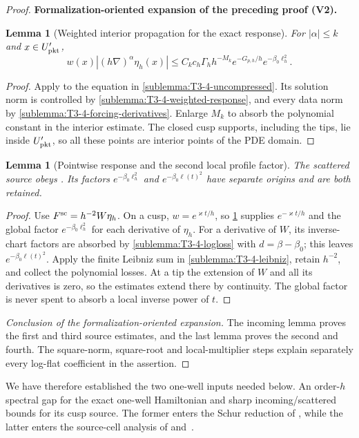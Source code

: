 \documentclass[11pt]{article}
\newtheorem{lemma}[theorem]{Lemma}
\newcommand{\formalisationparentid}{X}
\newenvironment{formalisationaddition}[1]{\par\medskip\begingroup\color{blue}\def\formalisationparentid{#1}\setcounter{formalizationsublemma}{0}\let\lemma\formalizationsublemma\let\endlemma\endformalizationsublemma
  \def\Eo{\mathcal E_h^\circ}\def\EE{\mathcal E_h}\def\phio{\phi_h^\circ}\def\phih{\phi_h}\def\Ho{H_h^{\rm atom}(v^\circ)}\def\Ha{H_h^{\rm atom}}\def\HL{H_h^{L}}\def\Dh{D_h}\def\Log{\operatorname{Log}}\def\ellh{\ell_h}\def\Gp{G_{p,h}}\def\Ast{A_{*,h}}\def\ahat{\widehat{\mathfrak a}_h}\def\ah{\mathfrak a_h}\def\rh{\widehat\rho_h}\def\deltah{\widehat\delta_h}\def\oldref##1{\textup{(##1)}}\def\interface##1{\par\noindent\textit{Analytical interface used here.} ##1\par}\def\finish{\par\noindent\textit{Conclusion of the formalization-oriented expansion.} }\par\noindent\textbf{Formalization-oriented expansion of the preceding proof (V2).}\par\smallskip
}{\par\endgroup\medskip
}
\begin{document}
\begin{proof}
\begin{formalisationaddition}{T3.4}
\begin{lemma}[Weighted interior propagation for the exact response]\label{sublemma:T3-4-response-interior}
For $|\alpha|\le k$ and $x\in U'_{\rm pkt}$,
\[
 w(x)|(h\nabla)^\alpha\eta_h(x)|
 \le C_kc_h\Gamma_hh^{-M_k}e^{-G_{p,h}/h}e^{-\beta_0\ell_h^2}.
\]
\end{lemma}
\begin{proof}
Apply  to the equation
in \ref{sublemma:T3-4-uncompressed}. Its solution norm is controlled
by \ref{sublemma:T3-4-weighted-response}, and every data norm by
\ref{sublemma:T3-4-forcing-derivatives}. Enlarge $M_k$ to absorb the
polynomial constant in the interior estimate. The closed cusp supports,
including the tips, lie inside $U'_{\rm pkt}$, so all these points are
interior points of the PDE domain.
\end{proof}

\begin{lemma}[Pointwise response and the second local profile factor]\label{sublemma:T3-4-pointwise-response}
The scattered source obeys .
Its factors $e^{-\beta_0\ell_h^2}$ and $e^{-\beta_0\ell(t)^2}$ have
separate origins and are both retained.
\end{lemma}
\begin{proof}
Use $F^{\rm sc}=h^{-2}W\eta_h$. On a cusp, $w=e^{\varkappa t/h}$,
so \ref{sublemma:T3-4-response-interior} supplies
$e^{-\varkappa t/h}$ and the global factor
$e^{-\beta_0\ell_h^2}$ for each derivative of $\eta_h$.
For a derivative of $W$, its inverse-chart factors are absorbed by
\ref{sublemma:T3-4-logloss} with $d=\beta-\beta_0$; this leaves
$e^{-\beta_0\ell(t)^2}$. Apply the finite Leibniz sum in
\ref{sublemma:T3-4-leibniz}, retain $h^{-2}$, and collect the polynomial
losses. At a tip the extension of $W$ and all its derivatives is zero,
so the estimates extend there by continuity. The global factor is never
spent to absorb a local inverse power of $t$.
\end{proof}
\finish The incoming lemma proves the first and third source estimates,
and the last lemma proves the second and fourth. The square-norm,
square-root and local-multiplier steps explain separately every log-flat
coefficient in the assertion.
\end{formalisationaddition}

\end{proof}

We have therefore established the two one-well inputs needed below. An order-$h$ spectral gap for the exact one-well Hamiltonian and sharp incoming/scattered bounds for its cusp source. The former enters the Schur reduction of , while the latter enters the source-cell analysis of  and~.
\end{document}

